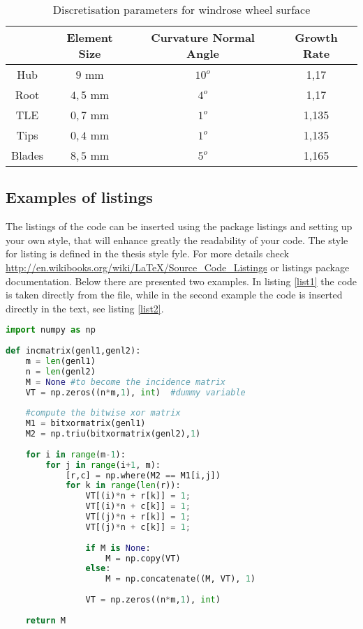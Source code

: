 \begin{table}[ht!]
\centering
\caption{Discretisation parameters for windrose wheel surface}
{
\renewcommand{\arraystretch}{1.25}
\begin{tabular}{ c|c|c|c }
\hline           
       & Element Size & Curvature Normal  Angle & Growth Rate \\ \hline \hline
 Hub & $9$ mm & $10^o$ & 1,17 \\ 
 Root & $4,5$ mm & $4^o$ & 1,17 \\ 
 TLE & $0,7$ mm & $1^o$ & 1,135 \\
 Tips & $0,4$ mm & $1^o$ & 1,135 \\ 
 Blades & $8,5$ mm & $5^o$ & 1,165 \\ \hline 
\end{tabular}
}
\label{Tab3_1}
\end{table}

\subsection{Examples of listings}The listings of the code can be inserted using the package listings and setting up your own style, that will enhance greatly the readability of your code. The style for listing is defined in the thesis style fyle. For more details check \url{http://en.wikibooks.org/wiki/LaTeX/Source_Code_Listings} or listings package documentation. Below there are presented two examples. In listing \ref{list1} the code is taken directly from the file, while in the second example the code is inserted directly in the text, see listing \ref{list2}.  




\begin{lstlisting}[language=Python, caption={Python example, code is listed}, label=list2]
import numpy as np
 
def incmatrix(genl1,genl2):
    m = len(genl1)
    n = len(genl2)
    M = None #to become the incidence matrix
    VT = np.zeros((n*m,1), int)  #dummy variable
 
    #compute the bitwise xor matrix
    M1 = bitxormatrix(genl1)
    M2 = np.triu(bitxormatrix(genl2),1) 
 
    for i in range(m-1):
        for j in range(i+1, m):
            [r,c] = np.where(M2 == M1[i,j])
            for k in range(len(r)):
                VT[(i)*n + r[k]] = 1;
                VT[(i)*n + c[k]] = 1;
                VT[(j)*n + r[k]] = 1;
                VT[(j)*n + c[k]] = 1;
 
                if M is None:
                    M = np.copy(VT)
                else:
                    M = np.concatenate((M, VT), 1)
 
                VT = np.zeros((n*m,1), int)
 
    return M
\end{lstlisting}

\clearpage